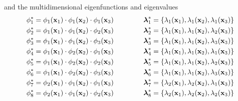 \documentclass[]{interact}
\theoremstyle{plain}%
\theoremstyle{definition}
\theoremstyle{remark}
\begin{document}
\noindent and the multidimensional eigenfunctions and eigenvalues
%
\begin{eqnarray}
\phi^{\ast}_1= \phi_{1}(\mathbf{x}_1) \cdot \phi_{1}(\mathbf{x}_2) \cdot \phi_{1}(\mathbf{x}_3) \hspace{1.5cm} \boldsymbol{\lambda}^{\ast}_1= \{\lambda_1(\mathbf{x}_1), \lambda_1(\mathbf{x}_2), \lambda_1(\mathbf{x}_3)\} \nonumber \\
%
\phi^{\ast}_2= \phi_{1}(\mathbf{x}_1) \cdot \phi_{1}(\mathbf{x}_2) \cdot \phi_{2}(\mathbf{x}_3) \hspace{1.5cm} \boldsymbol{\lambda}^{\ast}_2= \{\lambda_1(\mathbf{x}_1), \lambda_1(\mathbf{x}_2), \lambda_2(\mathbf{x}_3)\} \nonumber \\
%
\phi^{\ast}_3= \phi_{1}(\mathbf{x}_1) \cdot \phi_{1}(\mathbf{x}_2) \cdot \phi_{3}(\mathbf{x}_3) \hspace{1.5cm} \boldsymbol{\lambda}^{\ast}_3= \{\lambda_1(\mathbf{x}_1), \lambda_1(\mathbf{x}_2), \lambda_3(\mathbf{x}_3)\} \nonumber \\
%
\phi^{\ast}_4= \phi_{1}(\mathbf{x}_1) \cdot \phi_{2}(\mathbf{x}_2) \cdot \phi_{1}(\mathbf{x}_3) \hspace{1.5cm} \boldsymbol{\lambda}^{\ast}_4= \{\lambda_1(\mathbf{x}_1), \lambda_1(\mathbf{x}_2), \lambda_1(\mathbf{x}_3)\} \nonumber \\
%
\phi^{\ast}_5= \phi_{1}(\mathbf{x}_1) \cdot \phi_{2}(\mathbf{x}_2) \cdot \phi_{2}(\mathbf{x}_3) \hspace{1.5cm} \boldsymbol{\lambda}^{\ast}_5= \{\lambda_1(\mathbf{x}_1), \lambda_1(\mathbf{x}_2), \lambda_2(\mathbf{x}_3)\} \nonumber \\
%
\phi^{\ast}_6= \phi_{1}(\mathbf{x}_1) \cdot \phi_{2}(\mathbf{x}_2) \cdot \phi_{3}(\mathbf{x}_3) \hspace{1.5cm} \boldsymbol{\lambda}^{\ast}_6= \{\lambda_1(\mathbf{x}_1), \lambda_1(\mathbf{x}_2), \lambda_3(\mathbf{x}_3)\} \nonumber \\
%
\phi^{\ast}_7= \phi_{2}(\mathbf{x}_1) \cdot \phi_{1}(\mathbf{x}_2) \cdot \phi_{1}(\mathbf{x}_3) \hspace{1.5cm} \boldsymbol{\lambda}^{\ast}_7= \{\lambda_2(\mathbf{x}_1), \lambda_2(\mathbf{x}_2), \lambda_1(\mathbf{x}_3)\} \nonumber \\
%
\phi^{\ast}_8= \phi_{2}(\mathbf{x}_1) \cdot \phi_{1}(\mathbf{x}_2) \cdot \phi_{2}(\mathbf{x}_3) \hspace{1.5cm} \boldsymbol{\lambda}^{\ast}_8= \{\lambda_2(\mathbf{x}_1), \lambda_2(\mathbf{x}_2), \lambda_2(\mathbf{x}_3)\} \nonumber \\

\end{eqnarray}
\end{document}
